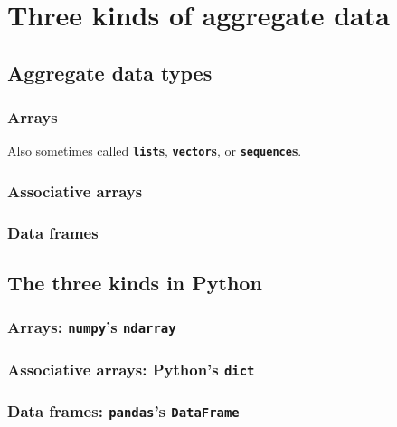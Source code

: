 
\chapter{Three kinds of aggregate data}

\section{Aggregate data types}

\subsection{Arrays}

Also sometimes called \textbf{\texttt{list}s}, \textbf{\texttt{vector}s}, or
\textbf{\texttt{sequence}s}.

\subsection{Associative arrays}

\subsection{Data frames}

\section{The three kinds in Python}

\subsection{Arrays: \texttt{numpy}'s \texttt{ndarray}}

\subsection{Associative arrays: Python's \texttt{dict}}

\subsection{Data frames: \texttt{pandas}'s \texttt{DataFrame}}
